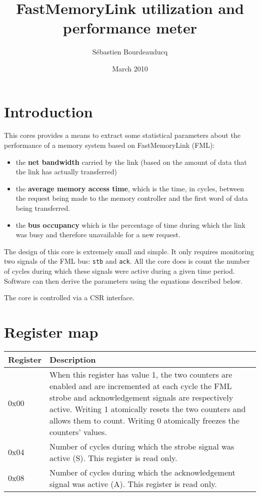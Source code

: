\documentclass[a4paper,11pt]{article}
\title{FastMemoryLink utilization and performance meter}
\author{S\'ebastien Bourdeauducq}
\date{March 2010}
\begin{document}
\setlength{\parindent}{0pt}
\setlength{\parskip}{5pt}
\maketitle{}
\section{Introduction}
This cores provides a means to extract some statistical parameters about the performance of a memory system based on FastMemoryLink (FML):
\begin{itemize}
\item the \textbf{net bandwidth} carried by the link (based on the amount of data that the link has actually transferred)
\item the \textbf{average memory access time}, which is the time, in cycles, between the request being made to the memory controller and the first word of data being transferred.
\item the \textbf{bus occupancy} which is the percentage of time during which the link was busy and therefore unavailable for a new request.
\end{itemize}

The design of this core is extremely small and simple. It only requires monitoring two signals of the FML bus: \verb!stb! and \verb!ack!. All the core does is count the number of cycles during which these signals were active during a given time period. Software can then derive the parameters using the equations described below.

The core is controlled via a CSR interface.

\section{Register map}

\begin{tabularx}{450pt}{|l|X|}
\hline
\textbf{Register} & \textbf{Description} \\
\hline
0x00 & When this register has value 1, the two counters are enabled and are incremented at each cycle the FML strobe and acknowledgement signals are respectively active. Writing 1 atomically resets the two counters and allows them to count. Writing 0 atomically freezes the counters' values. \\
\hline
0x04 & Number of cycles during which the strobe signal was active (S). This register is read only. \\
\hline
0x08 & Number of cycles during which the acknowledgement signal was active (A). This register is read only. \\
\hline
\end{tabularx}
\end{document}
